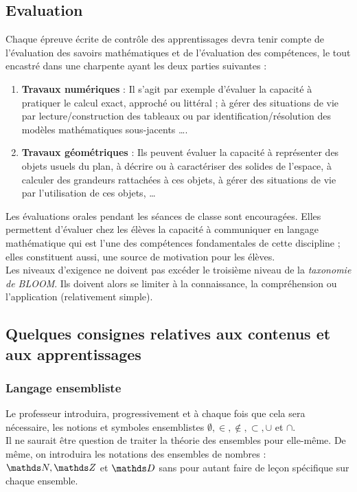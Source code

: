 \subsection*{Evaluation}

Chaque épreuve écrite de contrôle des apprentissages devra tenir compte de l'évaluation des savoirs mathématiques et de l'évaluation des compétences, le tout encastré dans une charpente ayant les deux parties suivantes :
\begin{enumerate}
\item  \textbf{Travaux numériques }: Il s'agit par exemple d'évaluer la capacité à pratiquer le calcul exact, approché ou littéral ; à gérer des situations de vie par lecture/construction des tableaux ou par identification/résolution des modèles mathématiques sous-jacents ….
\item \textbf{Travaux géométriques} : Ils peuvent évaluer la capacité à représenter des objets usuels du plan, à décrire ou à caractériser des solides de l'espace, à calculer des grandeurs rattachées à ces objets, à gérer des situations de vie par l'utilisation de ces objets, …
\end{enumerate}
Les évaluations orales pendant les séances de classe sont encouragées. Elles permettent d'évaluer chez les élèves la capacité à communiquer en langage mathématique qui est l'une des compétences fondamentales de cette discipline ; elles constituent aussi, une source de motivation pour les élèves.\\
Les niveaux d'exigence ne doivent pas excéder le troisième niveau de la\textit{ taxonomie de BLOOM}. Ils doivent alors se limiter à la connaissance, la compréhension ou l'application (relativement simple).

\subsection*{Quelques consignes relatives aux contenus et aux apprentissages}
\subsubsection*{Langage ensembliste}
Le professeur introduira, progressivement et à chaque fois que cela sera nécessaire, les notions et symboles ensemblistes $\emptyset, \in, \notin, \subset, \cup$ et $\cap$.\\
Il ne saurait être question de traiter la théorie des ensembles pour elle-même. De même, on introduira les notations des ensembles de nombres :  $\G N, \G Z$ et $\G D$ sans pour autant faire de leçon spécifique sur chaque ensemble.
